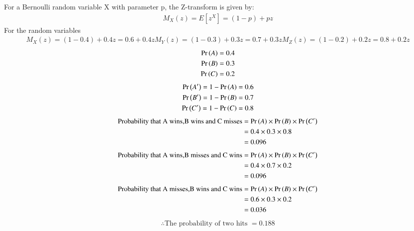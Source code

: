 \documentclass[journal,12pt,onecolumn]{IEEEtran}
\theoremstyle{remark}
\begin{document}
For a Bernoulli random variable X with parameter p, the Z-transform is given by:
\begin{align}
M_X(z) =E[z^{X}]= (1 - p) + pz
\end{align}
For the random variables
\begin{align}
M_X(z)=(1 − 0.4)+0.4z=0.6+0.4z
M_Y(z)=(1 − 0.3)+0.3z=0.7+0.3z
M_Z(z)=(1 − 0.2)+0.2z=0.8+0.2z
\end{align}
\begin{align}
\Pr\left(A\right)=0.4\\
\Pr\left(B\right)=0.3\\
\Pr\left(C\right)=0.2
\end{align}
\begin{align}
\Pr\left(A^\prime\right)=1-\Pr\left(A\right)=0.6\\
\Pr\left(B^\prime\right)=1-\Pr\left(B\right)=0.7\\
\Pr\left(C^\prime\right)=1-\Pr\left(C\right)=0.8
\end{align}
\begin{align}
\text{Probability that A wins,B wins and C misses}&= \Pr\left(A\right)\times\Pr\left(B\right)\times\Pr\left(C^\prime\right)\\
&=0.4\times 0.3\times 0.8\\
&=0.096
\end{align}
\begin{align}
\text{Probability that A wins,B misses and C wins}&= \Pr\left(A\right)\times\Pr\left(B\right)\times\Pr\left(C^\prime\right)\\
&=0.4\times 0.7\times 0.2 \\
&=0.096
\end{align}
\begin{align}
\text{Probability that A misses,B wins and C wins}&= \Pr\left(A\right)\times\Pr\left(B\right)\times\Pr\left(C^\prime\right)\\
&=0.6\times 0.3\times 0.2\\
&=0.036
\end{align}
\begin{align}
\therefore \text{The probability of two hits } =0.188
\end{align}
\end{document}
